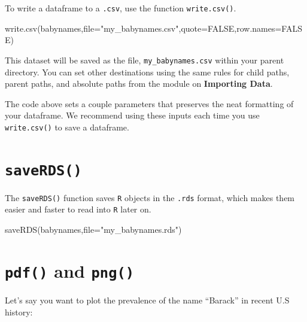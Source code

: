 \documentclass[
]{book}
\newenvironment{Shaded}{\begin{snugshade}}{\end{snugshade}}
\newcommand{\AttributeTok}[1]{\textcolor[rgb]{0.77,0.63,0.00}{#1}}
\newcommand{\ConstantTok}[1]{\textcolor[rgb]{0.00,0.00,0.00}{#1}}
\newcommand{\FunctionTok}[1]{\textcolor[rgb]{0.00,0.00,0.00}{#1}}
\newcommand{\NormalTok}[1]{#1}
\newcommand{\StringTok}[1]{\textcolor[rgb]{0.31,0.60,0.02}{#1}}
\begin{document}
To write a dataframe to a \texttt{.csv}, use the function \texttt{write.csv()}.

\begin{Shaded}
\begin{Highlighting}[]
\FunctionTok{write.csv}\NormalTok{(babynames,}\AttributeTok{file=}\StringTok{"my\_babynames.csv"}\NormalTok{,}\AttributeTok{quote=}\ConstantTok{FALSE}\NormalTok{,}\AttributeTok{row.names=}\ConstantTok{FALSE}\NormalTok{)}
\end{Highlighting}
\end{Shaded}

This dataset will be saved as the file, \texttt{my\_babynames.csv} within your parent directory. You can set other destinations using the same rules for child paths, parent paths, and absolute paths from the module on \textbf{Importing Data}.

The code above sets a couple parameters that preserves the neat formatting of your dataframe. We recommend using these inputs each time you use \texttt{write.csv()} to save a dataframe.

\hypertarget{saverds}{%
\section*{\texorpdfstring{\texttt{saveRDS()}}{saveRDS()}}\label{saverds}}

The \texttt{saveRDS()} function saves \texttt{R} objects in the \texttt{.rds} format, which makes them easier and faster to read into \texttt{R} later on.

\begin{Shaded}
\begin{Highlighting}[]
\FunctionTok{saveRDS}\NormalTok{(babynames,}\AttributeTok{file=}\StringTok{"my\_babynames.rds"}\NormalTok{)}
\end{Highlighting}
\end{Shaded}

\hypertarget{pdf-and-png}{%
\section*{\texorpdfstring{\texttt{pdf()} and \texttt{png()}}{pdf() and png()}}\label{pdf-and-png}}

Let's say you want to plot the prevalence of the name ``Barack'' in recent U.S history:
\end{document}
